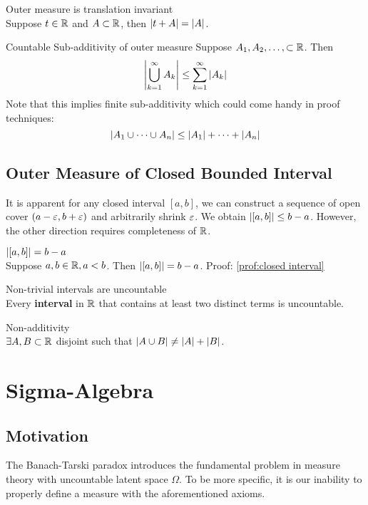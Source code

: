 \begin{prop}{Outer measure is translation invariant}\\
Suppose $t\in {\mathbb{R}}$ and $A\subset {\mathbb{R}}$, then $\abs{t+A} = \abs{A}$.
\end{prop}

\begin{prop}{Countable Sub-additivity of outer measure}
Suppose $A_1, A_2, \dots, \subset {\mathbb{R}}$. Then 
$$\abs{\bigcup_{k=1}^\infty A_k} \leq \sum_{k=1}^\infty \abs{A_k}$$	
Note that this implies finite sub-additivity which could come handy in proof techniques: 
$$\abs{A_1\cup \dots \cup A_n} \leq \abs{A_1} + \dots + \abs{A_n}$$
\end{prop}

\subsection*{Outer Measure of Closed Bounded Interval}
It is apparent for any closed interval $[a, b]$, we can construct a sequence of open cover $(a-{\varepsilon}, b+{\varepsilon})$ and arbitrarily shrink ${\varepsilon}$. We obtain $\abs{[a, b]} \leq b-a$. However, the other direction requires completeness of ${\mathbb{R}}$. \\

\begin{prop}{$\abs{[a, b]} = b-a$}\\
Suppose $a, b\in {\mathbb{R}}, a<b$. Then $\abs{[a, b]} = b-a$. 
Proof: \ref{prof:closed interval}
\end{prop}

\begin{prop}{Non-trivial intervals are uncountable}\\
	Every \textbf{interval} in ${\mathbb{R}}$ that contains at least two distinct terms is uncountable. 
\end{prop}

\begin{prop}{Non-additivity}\\
	$\exists A, B\subset {\mathbb{R}}$ disjoint such that $\abs{A\cup B} \neq \abs{A} + \abs{B}$. 
\end{prop}


\newpage
\section{Sigma-Algebra}
\subsection{Motivation}
The Banach-Tarski paradox introduces the fundamental problem in measure theory with uncountable latent space $\Omega$. To be more specific, it is our inability to properly define a measure with the aforementioned axioms. \\

